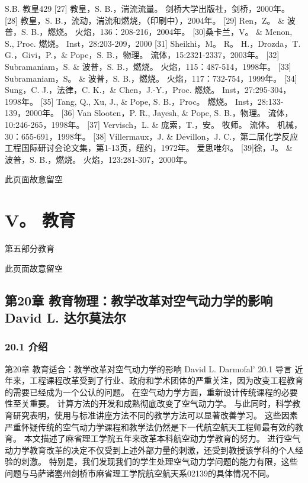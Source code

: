 \documentclass[UTF8,11pt,a4paper,openany,fontset=fandol]{ctexbook}
\begin{document}
S.B. 教皇429 [27] 教皇，S. B.，湍流流量。 剑桥大学出版社，剑桥，2000年。 [28] 教皇，S. B.，流动，湍流和燃烧，（印刷中），2004年。 [29] Ren，Z。 \& 波普，S. B.，燃烧。 火焰，136：208-216，2004年。 [30]桑卡兰，V。 \& Menon, S., Proc. 燃烧。 Inst，28:203-209，2000 [31] Sheikhi，M。 R。 H.，Drozda，T. G.，Givi，P.，\& Pope，S. B.，物理。 流体，15:2321-2337，2003年。 [32] Subramaniam，S. \& 波普，S. B.，燃烧。 火焰，115：487-514，1998年。 [33] Subramaniam，S。 \& 波普，S. B.，燃烧。 火焰，117：732-754，1999年。 [34] Sung，C. J.，法律，C. K.，\& Chen，J.-Y.，Proc. 燃烧。 Inst，27:295-304，1998年。 [35] Tang, Q., Xu, J., \& Pope, S. B.，Proc。 燃烧。 Inst，28:133-139，2000年。 [36] Van Slooten，P. R., Jayesh, \& Pope, S. B.，物理。 流体，10:246-265，1998年。 [37] Vervisch，L. \& 庞索，T.，安。 牧师。 流体。 机械，30：655-691，1998年。 [38] Villermaux，J. \& Devillon，J. C.，第二届化学反应工程国际研讨会论文集，第1-13页，纽约，1972年。 爱思唯尔。 [39]徐，J。 \& 波普，S. B.，燃烧。 火焰，123:281-307，2000年。

此页面故意留空

\clearpage
\part{V。 教育}
第五部分教育

此页面故意留空

\clearpage
\chapter{第20章 教育物理：教学改革对空气动力学的影响 David L. 达尔莫法尔}
\section{20.1 介绍}
第20章 教育适合：教学改革对空气动力学的影响 David L. Darmofal' 20.1 导言 近年来，工程课程改革受到了行业、政府和学术团体的严重关注，因为改变工程教育的需要已经成为一个公认的问题。 在空气动力学方面，重新设计传统课程的必要性至关重要。 计算方法的开发和成熟彻底改变了空气动力学。 与此同时，科学教育研究表明，使用与标准讲座方法不同的教学方法可以显著改善学习。 这些因素严重怀疑传统的空气动力学课程和教学法仍然是下一代航空航天工程师最有效的教育。 本文描述了麻省理工学院五年来改革本科航空动力学教育的努力。 进行空气动力学教育改革的决定不仅受到上述外部力量的刺激，还受到教授该学科的个人经验的刺激。 特别是，我们发现我们的学生处理空气动力学问题的能力有限，这些问题与马萨诸塞州剑桥市麻省理工学院航空航天系02139的具体情况不同。
\end{document}
